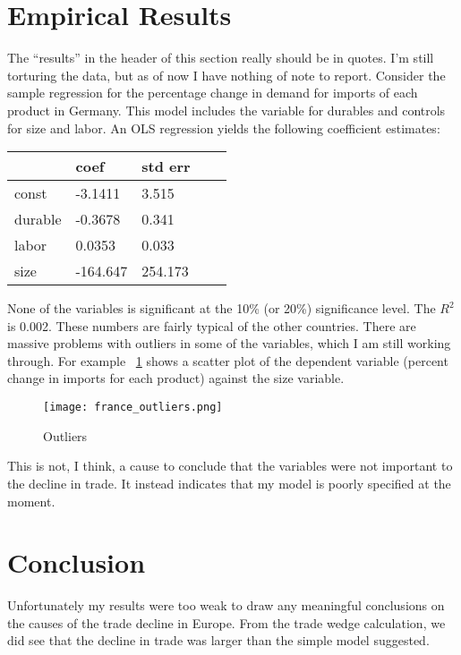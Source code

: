 \documentclass[11pt]{article}
\begin{document}
\section{Empirical Results} %
\label{sec:empirical_results}
  The ``results'' in the header of this section really should be in quotes.  I'm still torturing the data, but as of now I have nothing of note to report.  Consider the sample regression for the percentage change in demand for imports of each product in Germany.  This model includes the variable for durables and controls for size and labor.  An OLS regression yields the following coefficient estimates:

  \begin{center}
    \begin{tabular}{|l|l|l|l|l|}
    \hline
            & coef     & std err \\ \hline
    const   & -3.1411  & 3.515   \\
    durable & -0.3678  & 0.341   \\
    labor   & 0.0353   & 0.033   \\
    size    & -164.647 & 254.173 \\ \hline

    \end{tabular}
  \end{center}    
  
  None of the variables is significant at the 10\% (or 20\%) significance level. The $R^2$ is 0.002.  These numbers are fairly typical of the other countries.  There are massive problems with outliers in some of the variables, which I am still working through.  For example ~\ref{fig:outliers} shows a scatter plot of the dependent variable (percent change in imports for each product) against the size variable.

  \begin{figure}[h]\label{fig:outliers}
    \centering
      \texttt{[image: france\_outliers.png]}
    \caption{Outliers}
  \end{figure}

   This is not, I think, a cause to conclude that the variables were not important to the decline in trade.  It instead indicates that my model is poorly specified at the moment.

\section{Conclusion}
\label{sec:conclusion}
  Unfortunately my results were too weak to draw any meaningful conclusions on the causes of the trade decline in Europe.  From the trade wedge calculation, we did see that the decline in trade was larger than the simple model suggested.  
\end{document}
